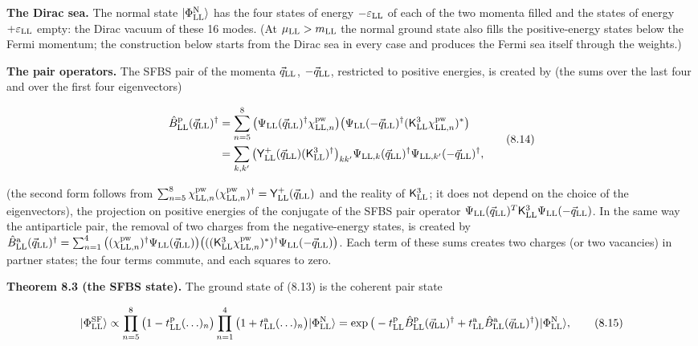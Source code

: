 \documentclass[
  10pt,
]{article}
\begin{document}
\textbf{The Dirac sea.} The normal state
\(\lvert\Phi^{\rm N}_{\rm LL}\rangle\) has the four states of energy
\(-\varepsilon_{\rm LL}\) of each of the two momenta filled and the
states of energy \(+\varepsilon_{\rm LL}\) empty: the Dirac vacuum of
these 16 modes. (At \(\mu_{\rm LL}>m_{\rm LL}\) the normal ground state
also fills the positive-energy states below the Fermi momentum; the
construction below starts from the Dirac sea in every case and produces
the Fermi sea itself through the weights.)

\textbf{The pair operators.} The SFBS pair of the momenta
\(\vec q_{\rm LL}\), \(-\vec q_{\rm LL}\), restricted to positive
energies, is created by (the sums over the last four and over the first
four eigenvectors)

\[\begin{aligned}\hat B^{\rm p}_{\rm LL}(\vec q_{\rm LL})^\dagger&=\sum_{n=5}^8\big(\Psi_{\rm LL}(\vec q_{\rm LL})^\dagger\chi^{\rm pw}_{{\rm LL},n}\big)\big(\Psi_{\rm LL}(-\vec q_{\rm LL})^\dagger(\mathsf K^3_{\rm LL}\chi^{\rm pw}_{{\rm LL},n})^*\big)\\&=\sum_{k,k'}\big(\mathsf Y^+_{\rm LL}(\vec q_{\rm LL})(\mathsf K^3_{\rm LL})^\dagger\big)_{kk'}\Psi_{{\rm LL},k}(\vec q_{\rm LL})^\dagger\Psi_{{\rm LL},k'}(-\vec q_{\rm LL})^\dagger,\end{aligned}\tag{8.14}\]

(the second form follows from
\(\sum_{n=5}^8\chi^{\rm pw}_{{\rm LL},n}(\chi^{\rm pw}_{{\rm LL},n})^\dagger=\mathsf Y^+_{\rm LL}(\vec q_{\rm LL})\)
and the reality of \(\mathsf K^3_{\rm LL}\); it does not depend on the
choice of the eigenvectors), the projection on positive energies of the
conjugate of the SFBS pair operator
\(\Psi_{\rm LL}(\vec q_{\rm LL})^T\mathsf K^3_{\rm LL}\Psi_{\rm LL}(-\vec q_{\rm LL})\).
In the same way the antiparticle pair, the removal of two charges from
the negative-energy states, is created by
\(\hat B^{\rm a}_{\rm LL}(\vec q_{\rm LL})^\dagger=\sum_{n=1}^4\big((\chi^{\rm pw}_{{\rm LL},n})^\dagger\Psi_{\rm LL}(\vec q_{\rm LL})\big)\big(((\mathsf K^3_{\rm LL}\chi^{\rm pw}_{{\rm LL},n})^*)^\dagger\Psi_{\rm LL}(-\vec q_{\rm LL})\big)\).
Each term of these sums creates two charges (or two vacancies) in
partner states; the four terms commute, and each squares to zero.

\textbf{Theorem 8.3 (the SFBS state).} The ground state of (8.13) is the
coherent pair state

\[\lvert\Phi^{\rm SF}_{\rm LL}\rangle\propto\prod_{n=5}^8\big(1-t^{\rm p}_{\rm LL}(\ldots)_n\big)\prod_{n=1}^4\big(1+t^{\rm a}_{\rm LL}(\ldots)_n\big)\lvert\Phi^{\rm N}_{\rm LL}\rangle=\exp\big(-t^{\rm p}_{\rm LL}\hat B^{\rm p}_{\rm LL}(\vec q_{\rm LL})^\dagger+t^{\rm a}_{\rm LL}\hat B^{\rm a}_{\rm LL}(\vec q_{\rm LL})^\dagger\big)\lvert\Phi^{\rm N}_{\rm LL}\rangle,\tag{8.15}\]
\end{document}
